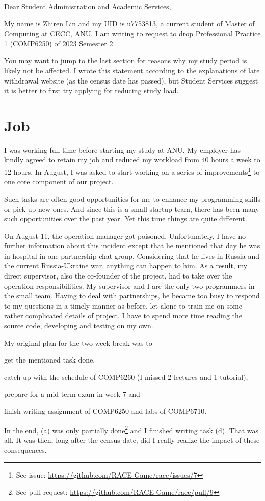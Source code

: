 \documentclass[12pt,a4paper]{article}
\begin{document}
\noindent
Dear Student Administration and Academic Services,

My name is Zhiren Lin and my UID is u7753813, a current student of Master of Computing at CECC, ANU. I am writing to request to drop  Professional Practice 1 (COMP6250) of 2023 Semester 2.

You may want to jump to the last section for reasons why my study period is likely not be affected.  I wrote this statement according to the explanations of late withdrawal website (as the census date has passed), but Student Services suggest it is better to first try applying for reducing study load.

\section{Job}
I was working full time before starting my study at ANU.  My employer has kindly agreed to retain my job and reduced my workload from 40 hours a week to 12 hours.  In August, I was asked to start working on a series of improvements\footnote{See issue: \url{https://github.com/RACE-Game/race/issues/7}} to one core component of our project.

Such tasks are often good opportunities for me to enhance my programming skills or pick up new ones.  And since this is a small startup team, there has been many such opportunities over the past year. Yet this time things are quite different.

On August 11, the operation manager got poisoned.  Unfortunately, I have no further information about this incident except that he mentioned that day he was in hospital in one partnership chat group.  Considering that he lives in Russia and the current Russia-Ukraine war, anything can happen to him.  As a result, my direct supervisor, also the co-founder of the project, had to take over the operation responsibilities.  My supervisor and I are the only two programmers in the small team.  Having to deal with partnerships, he became too busy to respond to my questions in a timely manner as before, let alone to train me on some rather complicated details of project.  I have to spend more time reading the source code, developing and testing on my own.

My original plan for the two-week break was to
\begin{enumerate*}[label=(\alph*), font=\bfseries]
\item get the mentioned task done,
\item catch up with the schedule of COMP6260 (I missed 2 lectures and 1 tutorial),
\item prepare for a mid-term exam in week 7 and
\item finish writing assignment of COMP6250 and labs of COMP6710.
\end{enumerate*}
In the end, (a) was only partially done\footnote{See pull request: \url{https://github.com/RACE-Game/race/pull/9}} and I finished writing task (d).  That was all.  It was then, long after the census date, did I really realize the impact of these consequences.
\end{document}
